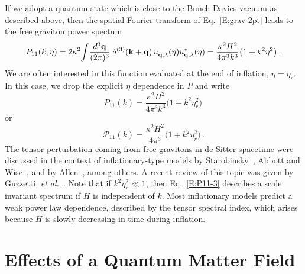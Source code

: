 \documentclass[preprint,prd,showpacs,superscriptaddress]{revtex4}
\begin{document}
If we adopt a quantum state which is close to the Bunch-Davies vacuum as described above, then the spatial
Fourier transform of Eq.~\eqref{E:grav-2pt} leads to the free graviton power spectum
\begin{equation}\label{E:P11}
	P_{11}(k,\eta)=2\kappa^{2}\!\int\!\frac{d^{3}\mathbf{q}}{(2\pi)^{3}}\;\delta^{(3)}(\mathbf{k}+\mathbf{q})\,
	u_{\mathbf{q},\lambda}^{\vphantom{*}}(\eta)u^{*}_{\mathbf{q},\lambda}(\eta)=
	\frac{\kappa^{2}H^{2}}{4\pi^{3}k^{3}}\bigl(1+k^{2}\eta^{2}\bigr)\,.
\end{equation}
We are often interested in this function evaluated at the end of inflation, $\eta =\eta_r$. In this case, we drop the
explicit $\eta$ dependence in $P$ and write
\begin{equation}
P_{11}(k) = \frac{\kappa^{2}H^{2}}{4\pi^{3}k^{3}}\bigl(1+k^{2}\eta_r^{2}\bigr)\,
\label{E:P11-2}
\end{equation}
or 
\begin{equation}
\mathcal{P}_{11}(k)=\frac{\kappa^{2}H^{2}}{4 \pi^{3}}\bigl(1+k^{2}\eta^{2}_{r}\bigr)\,.
\label{E:P11-3}
\end{equation}
The tensor perturbation coming from free gravitons in de Sitter spacetime were discussed in the context of
inflationary-type models by Starobinsky~\cite{Starobinsky79}, Abbott and Wise~\cite{AW84}, and by Allen~\cite{Allen88},
among others. A recent review of this topic was given by  Guzzetti, {\it et al.}~\cite{GBLM06}.  Note that if 
$k^{2}\eta^{2}_{r} \ll 1$, then Eq.~\eqref{E:P11-3} describes a scale invariant spectrum if $H$ is independent of
$k$. Most inflationary models predict a weak power law dependence, described by the tensor spectral index, which
arises because $H$ is slowly decreasing in time during inflation.



\section{Effects of a Quantum Matter Field}
\label{sec:matter}
\end{document}
